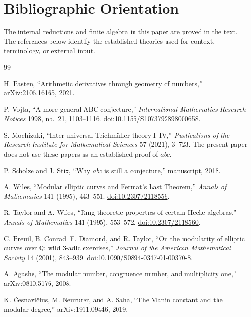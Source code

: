 \chapter{Bibliographic Orientation}

The internal reductions and finite algebra in this paper are proved in the text. The references below identify the established theories used for context, terminology, or external input.

\begin{thebibliography}{99}

H. Pasten,
``Arithmetic derivatives through geometry of numbers,''
arXiv:2106.16165, 2021.

P. Vojta,
``A more general ABC conjecture,''
\emph{International Mathematics Research Notices} 1998, no.~21, 1103--1116.
\href{https://doi.org/10.1155/S1073792898000658}{doi:10.1155/S1073792898000658}.

S. Mochizuki,
``Inter-universal Teichm\"uller theory I--IV,''
\emph{Publications of the Research Institute for Mathematical Sciences} 57 (2021), 3--723.
The present paper does not use these papers as an established proof of $abc$.

P. Scholze and J. Stix,
``Why $abc$ is still a conjecture,''
manuscript, 2018.

A. Wiles,
``Modular elliptic curves and Fermat's Last Theorem,''
\emph{Annals of Mathematics} 141 (1995), 443--551.
\href{https://doi.org/10.2307/2118559}{doi:10.2307/2118559}.

R. Taylor and A. Wiles,
``Ring-theoretic properties of certain Hecke algebras,''
\emph{Annals of Mathematics} 141 (1995), 553--572.
\href{https://doi.org/10.2307/2118560}{doi:10.2307/2118560}.

C. Breuil, B. Conrad, F. Diamond, and R. Taylor,
``On the modularity of elliptic curves over $\mathbb Q$: wild 3-adic exercises,''
\emph{Journal of the American Mathematical Society} 14 (2001), 843--939.
\href{https://doi.org/10.1090/S0894-0347-01-00370-8}{doi:10.1090/S0894-0347-01-00370-8}.

A. Agashe,
``The modular number, congruence number, and multiplicity one,''
arXiv:0810.5176, 2008.

K. \v{C}esnavi\v{c}ius, M. Neururer, and A. Saha,
``The Manin constant and the modular degree,''
arXiv:1911.09446, 2019.


\end{thebibliography}
